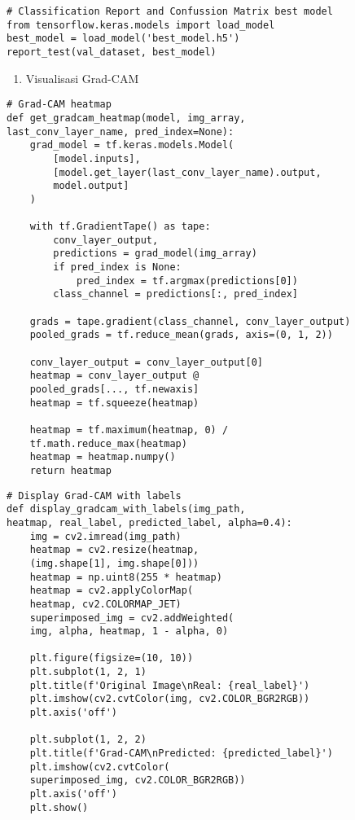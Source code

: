 \begin{lstlisting}[style=customc]
# Classification Report and Confussion Matrix best model
from tensorflow.keras.models import load_model
best_model = load_model('best_model.h5')
report_test(val_dataset, best_model)
\end{lstlisting}

\begin{enumerate}[label=\alph*., start=7]
    \item Visualisasi Grad-CAM
\end{enumerate}

\begin{lstlisting}[style=customc]
# Grad-CAM heatmap
def get_gradcam_heatmap(model, img_array, 
last_conv_layer_name, pred_index=None):
    grad_model = tf.keras.models.Model(
        [model.inputs], 
        [model.get_layer(last_conv_layer_name).output, 
        model.output]
    )

    with tf.GradientTape() as tape:
        conv_layer_output, 
        predictions = grad_model(img_array)
        if pred_index is None:
            pred_index = tf.argmax(predictions[0])
        class_channel = predictions[:, pred_index]

    grads = tape.gradient(class_channel, conv_layer_output)
    pooled_grads = tf.reduce_mean(grads, axis=(0, 1, 2))

    conv_layer_output = conv_layer_output[0]
    heatmap = conv_layer_output @ 
    pooled_grads[..., tf.newaxis]
    heatmap = tf.squeeze(heatmap)

    heatmap = tf.maximum(heatmap, 0) / 
    tf.math.reduce_max(heatmap)
    heatmap = heatmap.numpy()
    return heatmap
\end{lstlisting}

\begin{lstlisting}[style=customc]
# Display Grad-CAM with labels
def display_gradcam_with_labels(img_path, 
heatmap, real_label, predicted_label, alpha=0.4):
    img = cv2.imread(img_path)
    heatmap = cv2.resize(heatmap, 
    (img.shape[1], img.shape[0]))
    heatmap = np.uint8(255 * heatmap)
    heatmap = cv2.applyColorMap(
    heatmap, cv2.COLORMAP_JET)
    superimposed_img = cv2.addWeighted(
    img, alpha, heatmap, 1 - alpha, 0)

    plt.figure(figsize=(10, 10))
    plt.subplot(1, 2, 1)
    plt.title(f'Original Image\nReal: {real_label}')
    plt.imshow(cv2.cvtColor(img, cv2.COLOR_BGR2RGB))
    plt.axis('off')

    plt.subplot(1, 2, 2)
    plt.title(f'Grad-CAM\nPredicted: {predicted_label}')
    plt.imshow(cv2.cvtColor(
    superimposed_img, cv2.COLOR_BGR2RGB))
    plt.axis('off')
    plt.show()
\end{lstlisting}

